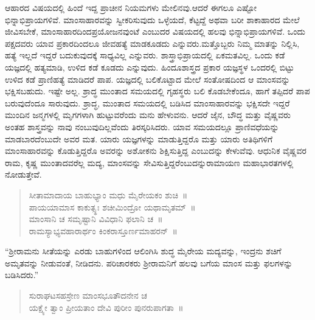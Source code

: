 ಆಹಾರದ ವಿಷಯದಲ್ಲಿ ಹಿಂದೆ ಇದ್ದ ಪ್ರಾಚೀನ ನಿಯಮಗಳು ಮೇಲಿನವು.ಆದರೆ ಈಗಲೂ ಎಷ್ಟೋ ಭಿನ್ನಾಭಿಪ್ರಾಯಗಳಿವೆ. ಮಾಂಸಾಹಾರವನ್ನು ಸ್ವೀಕರಿಸುವುದು ಒಳ್ಳೆಯದೆ, ಕೆಟ್ಟದ್ದೆ ಅಥವಾ ಬರೀ ಶಾಕಾಹಾರದ ಮೇಲೆ ಜೀವಿಸಬೇಕೆ, ಮಾಂಸಾಹಾರದಿಂದ\break ಪ್ರಯೋಜನವುಂಟೆ ಎಂಬುದರ ವಿಷಯದಲ್ಲಿ ಹಲವು ಭಿನ್ನಾಭಿಪ್ರಾಯಗಳಿವೆ. ಒಂದು ಪಕ್ಷದವರು ಯಾವ ಪ್ರಕಾರದಿಂದಲೂ ಜೀವಹತ್ಯೆ ಮಾಡಕೂಡದು ಎನ್ನುವರು.\break ಮತ್ತೊಬ್ಬರು ನಿಮ್ಮ ಮಾತನ್ನು ನಿಲ್ಲಿಸಿ, ಹತ್ಯೆ ಇಲ್ಲದೆ ಇದ್ದರೆ ಬದುಕುವುದಕ್ಕೆ ಸಾಧ್ಯವಿಲ್ಲ ಎನ್ನುವರು. ಶಾಸ್ತ್ರಾಭಿಪ್ರಾಯದಲ್ಲಿ ಏಕಮತವಿಲ್ಲ. ಒಂದು ಕಡೆ ಯಜ್ಞದಲ್ಲಿ ಹತ್ಯಮಾಡಿ, ಉಳಿದ ಕಡೆ ಕೂಡದು ಎನ್ನುವುದು. ಹಿಂದೂಶಾಸ್ತ್ರದ ಪ್ರಕಾರ ಯಜ್ಞಸ್ಥಳ ಒಂದರಲ್ಲಿ ಬಿಟ್ಟು ಉಳಿದ ಕಡೆ ಪ್ರಾಣಿಹತ್ಯೆ ಮಾಡಿದರೆ ಪಾಪ. ಯಜ್ಞದಲ್ಲಿ ಬಲಿಕೊಟ್ಟಾದ ಮೇಲೆ ಸಂತೋಷದಿಂದ ಆ ಮಾಂಸವನ್ನು ಭಕ್ಷಿಸಬಹುದು. ಇಷ್ಟೇ ಅಲ್ಲ. ಶ್ರಾದ್ಧ ಮುಂತಾದ ಸಮಯದಲ್ಲಿ ಗೃಹಸ್ಥರು ಬಲಿ ಕೊಡಬೇಕೆಂದೂ, ಹಾಗೆ ತಪ್ಪಿದರೆ ಪಾಪ ಬರುವುದೆಂದೂ ಸಾರುವುದು. ಶ್ರಾದ್ಧ, ಮುಂತಾದ ಸಮಯದಲ್ಲಿ ಬಡಿಸಿದ ಮಾಂಸಾಹಾರವನ್ನು ಭಕ್ಷಿಸದೇ ಇದ್ದರೆ ಮುಂದಿನ ಜನ್ಮಗಳಲ್ಲಿ ಮೃಗಗಳಾಗಿ ಹುಟ್ಟುವರೆಂದು ಮನು ಹೇಳುವನು. ಆದರೆ ಜೈನ, ಬೌದ್ಧ ಮತ್ತು ವೈಷ್ಣವರು ಅಂತಹ ಶಾಸ್ತ್ರವನ್ನು ನಾವು ನಂಬುವುದಿಲ್ಲವೆಂದು ತಿರಸ್ಕರಿಸಿದರು. ಯಾವ ಸಮಯದಲ್ಲೂ ಪ್ರಾಣಿವಧೆಯನ್ನು ಮಾಡಬಾರದೆಂಬುದೇ ಅವರ ಮತ. ಯಾರು ಯಜ್ಞಗಳನ್ನು ಮಾಡುತ್ತಿದ್ದರೊ ಮತ್ತು ಯಾರು ಅತಿಥಿಗಳಿಗೆ ಮಾಂಸಾಹಾರವನ್ನು ಕೊಡು\break ತ್ತಿದ್ದರೊ ಅವರನ್ನು ಅಶೋಕನು ಶಿಕ್ಷಿಸುತ್ತಿದ್ದ ಎಂಬುದನ್ನು ಕೇಳುವೆವು. ಆಧುನಿಕ ವೈಷ್ಣವರ ರಾಮ, ಕೃಷ್ಣ ಮುಂತಾದವರೆಲ್ಲ ಮದ್ಯ, ಮಾಂಸವನ್ನು ಸೇವಿಸುತ್ತಿದ್ದರೆಂಬುದನ್ನು\break ರಾಮಾಯಣ ಮಹಾಭಾರತಗಳಲ್ಲಿ ನೋಡುತ್ತೇವೆ.
\begin{verse}
ಸೀತಾಮಾದಾಯ ಬಾಹುಭ್ಯಾಂ ಮಧು ಮೈರೇಯಕಂ ಶುಚಿ~॥\\ಪಾಯಯಾಮಾಸ ಕಾಕುತ್ಸ್ಥಃ ಶಚೀಮಿಂದ್ರೋ ಯಥಾಮೃತಮ್​~॥\\ಮಾಂಸಾನಿ ಚ ಸಮೃಷ್ಟಾನಿ ವಿವಿಧಾನಿ ಫಲಾನಿ ಚ~॥\\ರಾಮಸ್ಯಾಭ್ಯವಹಾರಾರ್ಥಂ ಕಿಂಕರಾಸ್ತೂರ್ಣಮಾಹರನ್​~॥
\end{verse}
\begin{flushright}
{}
\end{flushright}

“ಶ‍್ರೀರಾಮನು ಸೀತೆಯನ್ನು ಎರಡು ಬಾಹುಗಳಿಂದ ಆಲಿಂಗಿಸಿ ಶುದ್ಧ ಮೈರೇಯ ಮದ್ಯವನ್ನು, ಇಂದ್ರನು ಶಚಿಗೆ ಅಮೃತವನ್ನು ನೀಡುವಂತೆ, ನೀಡಿದನು. ಪರಿಚಾರಕರು ಶ‍್ರೀರಾಮನಿಗೆ ಹಲವು ಬಗೆಯ ಮಾಂಸ ಮತ್ತು ಫಲಗಳನ್ನು ಬಡಿಸಿದರು.”

\newpage

\begin{verse}
ಸುರಾಘಟಸಹಸ್ರೇಣ ಮಾಂಸಭೂತೌದನೇನ ಚ\\ಯಕ್ಷ್ಯೇ ತ್ವಾಂ ಪ್ರೀಯತಾಂ ದೇವಿ ಪುರೀಂ ಪುನರುಪಾಗತಾ~॥\\
\end{verse}
\vspace{-0.6cm}

\begin{flushright}
\end{flushright}

